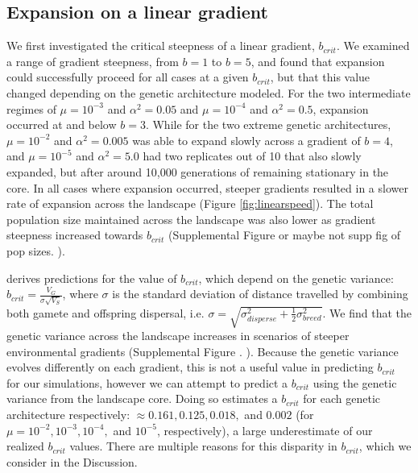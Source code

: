 \subsection{Expansion on a linear gradient}

We first investigated the critical steepness of a linear gradient, $b_{crit}$. %
We examined a range of gradient steepness, from $b = 1$ to $b = 5$, and found that expansion could successfully proceed for all cases at a given $b_{crit}$, but that this value changed depending on the genetic architecture modeled.  For the two intermediate regimes of $\mu = 10^{-3}$ and $\alpha^2 = 0.05$ and $\mu = 10^{-4}$ and $\alpha^2 = 0.5$, expansion occurred at and below $b = 3$. While for the two extreme genetic architectures, $\mu = 10^{-2}$ and $\alpha^2 = 0.005$ was able to expand slowly across a gradient of $b = 4$, and $\mu = 10^{-5}$ and $\alpha^2 = 5.0$ had two replicates out of 10 that also slowly expanded, but after around 10,000 generations of remaining stationary in the core. In all cases where expansion occurred, steeper gradients resulted in a slower rate of expansion across the landscape (Figure \ref{fig:linearspeed}). The total population size maintained across the landscape was also lower as gradient steepness increased towards $b_{crit}$ (Supplemental Figure or maybe not supp fig of pop sizes. ). 

\citet{Barton:2001} derives predictions for the value of $b_{crit}$, which depend on the genetic variance: $b_{crit} = \frac{V_G}{\sigma \sqrt{V_S}}$, where $\sigma$ is the standard deviation of distance travelled by combining both gamete and offspring dispersal, i.e. $\sigma = \sqrt{\sigma_{disperse}^2 + \frac{1}{2}\sigma_{breed}^2}$. We find that the genetic variance across the landscape increases in scenarios of steeper environmental gradients (Supplemental Figure . ). Because the genetic variance evolves differently on each gradient, this is not a useful value in predicting $b_{crit}$ for our simulations, however we can attempt to predict a $b_{crit}$ using the genetic variance from the landscape core. Doing so estimates a $b_{crit}$ for each genetic architecture respectively: $\approx 0.161, 0.125, 0.018,$ and $0.002$ (for $\mu = 10^{-2}, 10^{-3}, 10^{-4},$ and $10^{-5}$, respectively), a large underestimate of our realized $b_{crit}$ values. There are multiple reasons for this disparity in $b_{crit}$, which we consider in the Discussion.

